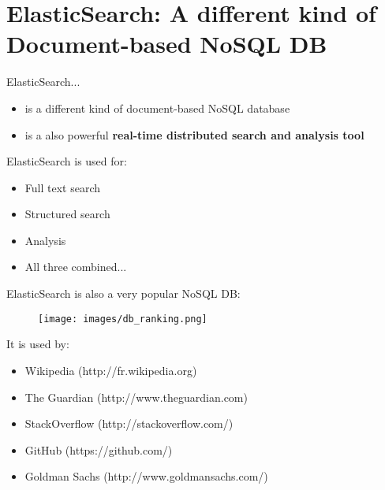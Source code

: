 \documentclass{beamer}[10pt, usepdftitle=false handout]
\begin{document}
\section{ElasticSearch: A different kind of Document-based NoSQL DB}
\begin{frame}
ElasticSearch...
\vspace*{0.6em}

\begin{itemize}
\item{is a different kind of document-based NoSQL database}
\item{is a also powerful \textbf{real-time distributed search and analysis tool}}
\end{itemize}

\vspace*{0.6em}
 
ElasticSearch is used for:
\vspace*{0.6em}

\begin{itemize}
\item{Full text search}
\item{Structured search}
\item{Analysis}
\item{All three combined...}
\end{itemize}
	
\end{frame}
\begin{frame}
ElasticSearch is also a very popular NoSQL DB:
\vspace*{0.6em}

\begin{figure}
	\texttt{[image: images/db\_ranking.png]} 
\end{figure}	
\vspace*{0.6em}
	
It is used by:
\vspace*{0.6em}

\begin{itemize}
\item{Wikipedia (http://fr.wikipedia.org)}
\item{The Guardian (http://www.theguardian.com)}
\item{StackOverflow (http://stackoverflow.com/)}
\item{GitHub (https://github.com/)}
\item{Goldman Sachs (http://www.goldmansachs.com/)}
\end{itemize}

\end{frame}
\end{document}
